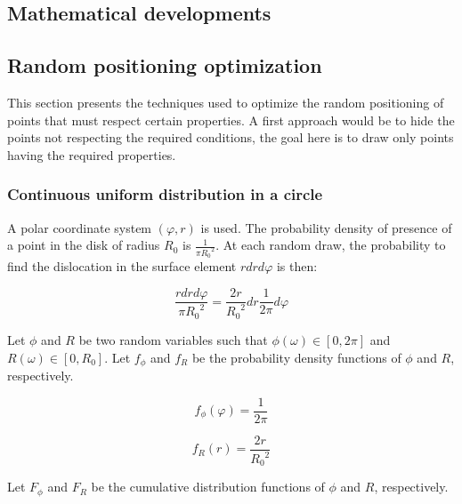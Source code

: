 \nocite{*}

\begin{appendix}

\section{Mathematical developments}

\subsection{Random positioning optimization}

This section presents the techniques used to optimize the random positioning of points that must respect certain properties.
A first approach would be to hide the points not respecting the required conditions, the goal here is to draw only points having the required properties.

\subsubsection{Continuous uniform distribution in a circle}\label{sec:circle-random-position}

A polar coordinate system \( (\varphi, r)\) is used.
The probability density of presence of a point in the disk of radius \( R_0 \) is \( \frac{1}{\pi {R_0}^2} \).
At each random draw, the probability to find the dislocation in the surface element \( r dr d\varphi\) is then:

\begin{equation}
\frac{r dr d\varphi}{\pi {R_0}^2} = \frac{2 r}{{R_0}^2} dr \frac{1}{2 \pi} d\varphi
\end{equation}

\bigskip

Let \( \phi \) and \( R \) be two random variables such that \( \phi(\omega) \in [0, 2\pi] \) and \( R(\omega) \in [0, R_0] \). Let \( f_\phi \) and \( f_R \) be the probability density functions of \( \phi \) and \( R \), respectively.

\begin{equation}
f_\phi(\varphi) = \frac{1}{2 \pi}
\end{equation}

\begin{equation}
f_R(r) = \frac{2r}{{R_0}^2}
\end{equation}

\medskip

Let \( F_\phi \) and  \( F_R \) be the  cumulative distribution functions of \( \phi \) and \( R \), respectively.


\end{appendix}
